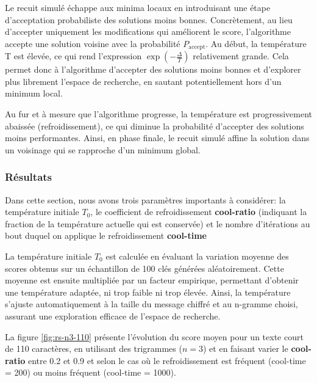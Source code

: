 \documentclass[a4paper]{article}
\begin{document}
Le recuit simulé échappe aux minima locaux en introduisant une étape d'acceptation probabiliste des solutions moins bonnes. Concrètement, au lieu d'accepter uniquement les modifications qui améliorent le score, l'algorithme accepte une solution voisine avec la probabilité $P_{\text{accept}}$.
Au début, la température T est élevée, ce qui rend l'expression $\exp\left(-\frac{\Delta}{T}\right)$ relativement grande. Cela permet donc à l'algorithme d'accepter des solutions moins bonnes et d'explorer plus librement l'espace de recherche, en sautant potentiellement hors d'un minimum local.

Au fur et à mesure que l'algorithme progresse, la température est progressivement abaissée (refroidissement), ce qui diminue la probabilité d'accepter des solutions moins performantes. Ainsi, en phase finale, le recuit simulé affine la solution dans un voisinage qui se rapproche d'un minimum global.


\subsubsection{Résultats}

Dans cette section, nous avons trois paramètres importants à considérer: la température initiale $T_0$, le coefficient de refroidissement \textbf{cool-ratio} (indiquant la fraction de la température actuelle qui est conservée) et le nombre d'itérations au bout duquel on applique le refroidissement \textbf{cool-time}

La température initiale $T_0$ est calculée en évaluant la variation moyenne des scores obtenus sur un échantillon de 100 clés générées aléatoirement. Cette moyenne est ensuite multipliée par un facteur empirique, permettant d'obtenir une température adaptée, ni trop faible ni trop élevée. 
Ainsi, la température s'ajuste automatiquement à la taille du message chiffré et au n-gramme choisi, assurant une exploration efficace de l'espace de recherche.


La figure \ref{fig:rs-n3-110} présente l'évolution du score moyen pour un
texte court de 110 caractères, en utilisant des trigrammes ($n=3$) et en faisant varier le \textbf{cool-ratio} entre 0.2 et 0.9 et selon le cas où le refroidissement est fréquent (cool-time = 200) ou moins fréquent (cool-time = 1000).
\end{document}
